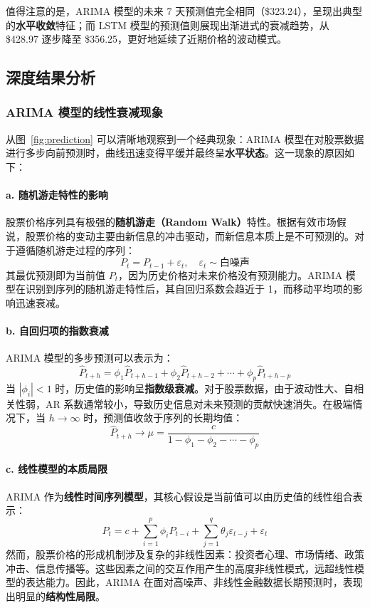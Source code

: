 \documentclass[a4paper]{article}
\begin{document}
值得注意的是，ARIMA 模型的未来 7 天预测值完全相同（\$323.24），呈现出典型的\textbf{水平收敛}特征；而 LSTM 模型的预测值则展现出渐进式的衰减趋势，从 \$428.97 逐步降至 \$356.25，更好地延续了近期价格的波动模式。

\subsection{深度结果分析}

\subsubsection{ARIMA 模型的线性衰减现象}

从图~\ref{fig:prediction} 可以清晰地观察到一个经典现象：ARIMA 模型在对股票数据进行多步向前预测时，曲线迅速变得平缓并最终呈\textbf{水平状态}。这一现象的原因如下：

\paragraph{a. 随机游走特性的影响}
股票价格序列具有极强的\textbf{随机游走（Random Walk）}特性。根据有效市场假说，股票价格的变动主要由新信息的冲击驱动，而新信息本质上是不可预测的。对于遵循随机游走过程的序列：
\[
P_t = P_{t-1} + \varepsilon_t, \quad \varepsilon_t \sim \text{白噪声}
\]
其最优预测即为当前值 $P_t$，因为历史价格对未来价格没有预测能力。ARIMA 模型在识别到序列的随机游走特性后，其自回归系数会趋近于 1，而移动平均项的影响迅速衰减。

\paragraph{b. 自回归项的指数衰减}
ARIMA 模型的多步预测可以表示为：
\[
\hat{P}_{t+h} = \phi_1 \hat{P}_{t+h-1} + \phi_2 \hat{P}_{t+h-2} + \cdots + \phi_p \hat{P}_{t+h-p}
\]
当 $|\phi_i| < 1$ 时，历史值的影响呈\textbf{指数级衰减}。对于股票数据，由于波动性大、自相关性弱，AR 系数通常较小，导致历史信息对未来预测的贡献快速消失。在极端情况下，当 $h \to \infty$ 时，预测值收敛于序列的长期均值：
\[
\hat{P}_{t+h} \to \mu = \frac{c}{1-\phi_1-\phi_2-\cdots-\phi_p}
\]

\paragraph{c. 线性模型的本质局限}
ARIMA 作为\textbf{线性时间序列模型}，其核心假设是当前值可以由历史值的线性组合表示：
\[
P_t = c + \sum_{i=1}^{p} \phi_i P_{t-i} + \sum_{j=1}^{q} \theta_j \varepsilon_{t-j} + \varepsilon_t
\]
然而，股票价格的形成机制涉及复杂的非线性因素：投资者心理、市场情绪、政策冲击、信息传播等。这些因素之间的交互作用产生的高度非线性模式，远超线性模型的表达能力。因此，ARIMA 在面对高噪声、非线性金融数据长期预测时，表现出明显的\textbf{结构性局限}。
\end{document}
